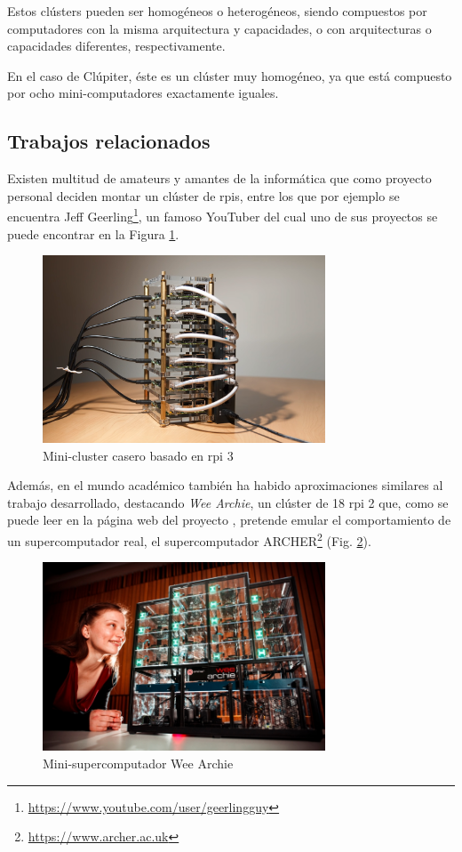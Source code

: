 Estos clústers pueden ser homogéneos o heterogéneos, siendo compuestos por computadores con la misma arquitectura y capacidades, o con arquitecturas o capacidades diferentes, respectivamente.

En el caso de Clúpiter, éste es un clúster muy homogéneo, ya que está compuesto por ocho mini-computadores exactamente iguales.

\subsection{Trabajos relacionados}
Existen multitud de amateurs y amantes de la informática que como proyecto personal deciden montar un clúster de \acrlong{rpi}s, entre los que por ejemplo se encuentra Jeff Geerling\footnote{\url{https://www.youtube.com/user/geerlingguy}}, un famoso YouTuber del cual uno de sus proyectos se puede encontrar en la Figura \ref{fig:cluster-pi-ejemplo}.

\begin{figure}[h!]
  \centering
  \includegraphics[width=0.75\textwidth]{img/cluster-pi-home.png}
  \caption{Mini-cluster casero basado en \acrlong{rpi} 3\cite{geerling_intro_cluster}}
  \label{fig:cluster-pi-ejemplo}
\end{figure}

Además, en el mundo académico también ha habido aproximaciones similares al trabajo desarrollado, destacando \textit{Wee Archie}, un clúster de 18 \acrlong{rpi} 2 que, como se puede leer en la página web del proyecto \cite{wee_archie_webpage}, pretende emular el comportamiento de un supercomputador real, el supercomputador ARCHER\footnote{\url{https://www.archer.ac.uk}} (Fig. \ref{fig:wee_archie_girl}).

\begin{figure}[h!]
  \centering
  \includegraphics[width=0.75\textwidth]{img/wee-girl.jpg}
  \caption{Mini-supercomputador Wee Archie}
  \label{fig:wee_archie_girl}
\end{figure}

